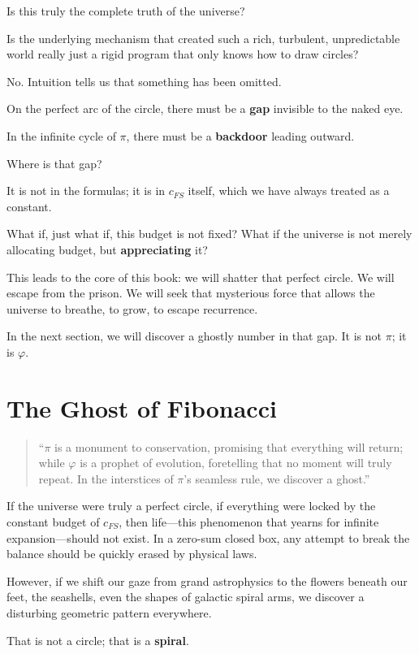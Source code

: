 Is this truly the complete truth of the universe?

Is the underlying mechanism that created such a rich, turbulent, unpredictable world really just a rigid program that only knows how to draw circles?

No. Intuition tells us that something has been omitted.

On the perfect arc of the circle, there must be a \textbf{gap} invisible to the naked eye.

In the infinite cycle of $\pi$, there must be a \textbf{backdoor} leading outward.

Where is that gap?

It is not in the formulas; it is in $c_{FS}$ itself, which we have always treated as a constant.

What if, just what if, this budget is not fixed? What if the universe is not merely allocating budget, but \textbf{appreciating} it?

This leads to the core of this book: we will shatter that perfect circle. We will escape from the prison. We will seek that mysterious force that allows the universe to breathe, to grow, to escape recurrence.

In the next section, we will discover a ghostly number in that gap. It is not $\pi$; it is $\varphi$.

\section{The Ghost of Fibonacci}

\begin{quote}
``$\pi$ is a monument to conservation, promising that everything will return; while $\varphi$ is a prophet of evolution, foretelling that no moment will truly repeat. In the interstices of $\pi$'s seamless rule, we discover a ghost.''
\end{quote}

If the universe were truly a perfect circle, if everything were locked by the constant budget of $c_{FS}$, then life---this phenomenon that yearns for infinite expansion---should not exist. In a zero-sum closed box, any attempt to break the balance should be quickly erased by physical laws.

However, if we shift our gaze from grand astrophysics to the flowers beneath our feet, the seashells, even the shapes of galactic spiral arms, we discover a disturbing geometric pattern everywhere.

That is not a circle; that is a \textbf{spiral}.

